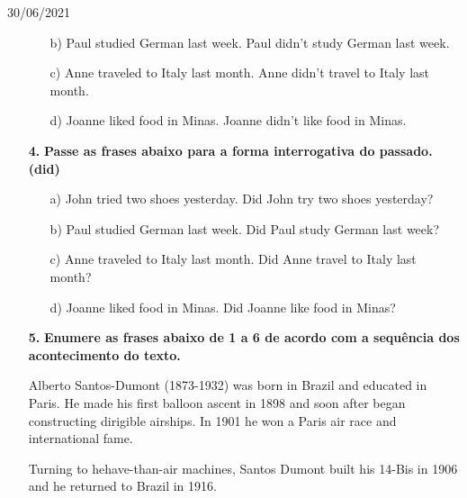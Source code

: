 \documentclass{SchoolBook}
\begin{document}
\begin{day}{30/06/2021}
\begin{enumerate}
\begin{enumerate}
                \item[b)] Paul studied German last week.
                \response Paul didn't study German last week.
                
                \item[c)] Anne traveled to Italy last month.
                \response Anne didn't travel to Italy last month.
                
                \item[d)] Joanne liked food in Minas.
                \response Joanne didn't like food in Minas.
            \end{enumerate}
            
            \item[\bf 4.] \textbf{Passe as frases abaixo para a forma interrogativa do passado. (did)}
            \begin{enumerate}
                \item[a)] John tried two shoes yesterday.
                \response Did John try two shoes yesterday?
                
                \item[b)] Paul studied German last week.
                \response Did Paul study German last week?
                
                \item[c)] Anne traveled to Italy last month.
                \response Did Anne travel to Italy last month?
                
                \item[d)] Joanne liked food in Minas.
                \response Did Joanne like food in Minas?
            \end{enumerate}
            
            \item[\bf 5.] \textbf{Enumere as frases abaixo de 1 a 6 de acordo com a sequência dos acontecimento do texto.}
            
            Alberto Santos-Dumont (1873-1932) was born in Brazil and educated in Paris. He made his first balloon ascent in 1898 and soon after began constructing dirigible airships. In 1901 he won a Paris air race and international fame.
            
            Turning to hehave-than-air machines, Santos Dumont built his 14-Bis in 1906 and he returned to Brazil in 1916.
            

\end{enumerate}
\end{day}
\end{document}
